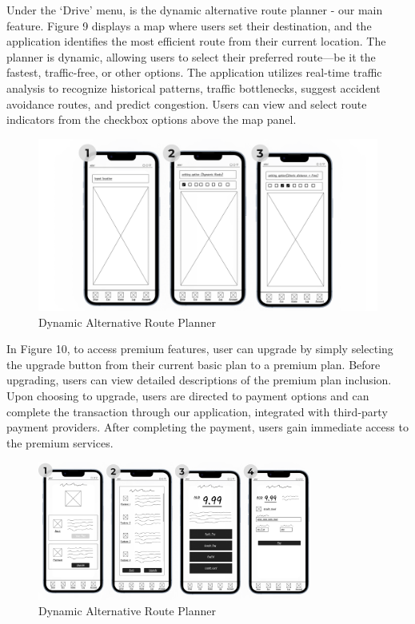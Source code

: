 \documentclass[12pt,a4paper]{article}
\begin{document}
\noindent Under the `Drive' menu, is the dynamic alternative route planner - our main feature. Figure 9 displays a map where users set their destination, and the application identifies the most efficient route from their current location. The planner is dynamic, allowing users to select their preferred route—be it the fastest, traffic-free, or other options. The application utilizes real-time traffic analysis to recognize historical patterns, traffic bottlenecks,  suggest accident avoidance routes, and predict congestion. Users can view and select route indicators from the checkbox options above the map panel.\\

\begin{figure}[h]
    \centering
    \includegraphics[width=0.8
    \textwidth]{images/Prototype Figures/Prototype Figure 4.png}
    \caption{Dynamic Alternative Route Planner}
    \label{fig:example}
\end{figure}


\noindent In Figure 10, to access premium features, user can upgrade by simply selecting the upgrade button from their current basic plan to a premium plan. Before upgrading, users can view detailed descriptions of the premium plan inclusion. Upon choosing to upgrade, users are directed to payment options and can complete the transaction through our application, integrated with third-party payment providers. After completing the payment, users gain immediate access to the premium services.\\
\begin{figure}[H]
    \centering
    \includegraphics[width=0.8\textwidth]{images/Prototype Figures/Prototype Figure 5.png} 
    \caption{Dynamic Alternative Route Planner}
    \label{fig:routeplanner}
\end{figure}
\end{document}

